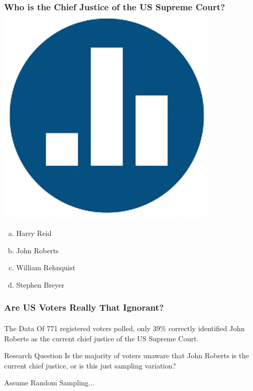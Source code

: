 \documentclass[handout]{beamer}
\begin{document}
\begin{frame}
\frametitle{Who is the Chief Justice of the US Supreme Court?\hfill \includegraphics[scale = 0.05]{./images/clicker}}
	\begin{enumerate}[(a)]
	\item Harry Reid
	\item John Roberts
	\item William Rehnquist
	\item Stephen Breyer
\end{enumerate}


\end{frame}
\begin{frame}
\frametitle{Are US Voters Really That Ignorant?}
\framesubtitle{}

\begin{block}{The Data}
Of 771 registered voters polled, only 39\% correctly identified John Roberts as the current chief justice of the US Supreme Court.
\end{block}

\begin{block}{Research Question}
Is the majority of voters unaware that John Roberts is the current chief justice, or is this just sampling variation?
\end{block}

\alert{Assume Random Sampling...}

\end{frame}
\end{document}
